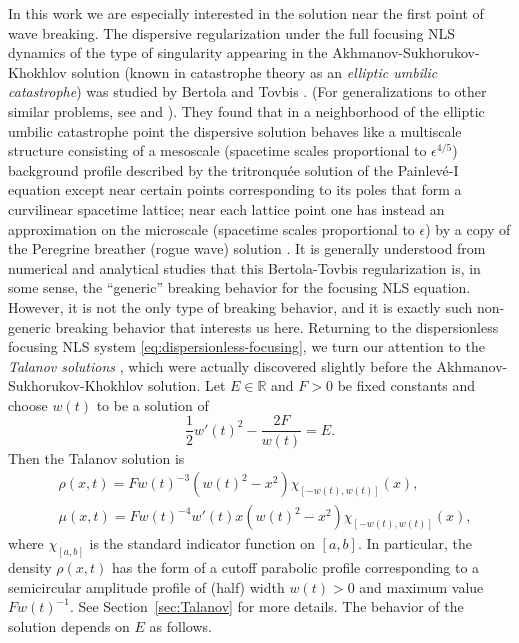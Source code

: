 \documentclass[12pt]{amsart}
\numberwithin{equation}{section}
\def\eq{\begin{equation}}
\def\endeq{\end{equation}}
\begin{document}
In this work we are especially interested in the solution near the first 
point of wave breaking.  The dispersive regularization under the full 
focusing NLS dynamics of the type of singularity appearing in the 
Akhmanov-Sukhorukov-Khokhlov solution (known in catastrophe theory as 
an \emph{elliptic umbilic catastrophe}) was studied by Bertola and Tovbis 
\cite{BertolaT13}. (For generalizations to other similar problems, see 
\cite{DubrovinGKM15} and \cite{LuM22}).  They found that in a neighborhood of 
the elliptic umbilic catastrophe point 
the dispersive solution behaves like a multiscale structure consisting of a 
mesoscale (spacetime scales proportional to $\epsilon^{4/5}$) background profile described by the tritronqu\'ee solution of the Painlev\'e-I equation except near certain points corresponding to its poles that form a 
curvilinear spacetime lattice; near each lattice point one has instead an 
approximation on the microscale (spacetime scales proportional to $\epsilon$) by a copy of the Peregrine breather (rogue 
wave) solution \cite{Peregrine83}.  It is generally understood from numerical 
and analytical studies that this Bertola-Tovbis regularization is, in some 
sense, the ``generic'' breaking behavior for the focusing NLS equation.  
However, it is not the only type of breaking behavior, and it is exactly such 
non-generic breaking behavior that interests us here.  Returning to the 
dispersionless focusing NLS system \eqref{eq:dispersionless-focusing}, we turn our attention to the 
\emph{Talanov solutions} \cite{Talanov65}, which were actually 
discovered slightly before the Akhmanov-Sukhorukov-Khokhlov solution.  Let 
$E\in\mathbb{R}$ and $F>0$ be fixed constants and choose $w(t)$ to be a 
solution of 
\eq
\frac{1}{2}w'(t)^2 -\frac{2F}{w(t)}=E.  
\endeq
Then the Talanov solution is 
\eq
\begin{split}
& \rho(x,t)=Fw(t)^{-3}(w(t)^2-x^2)\chi_{[-w(t),w(t)]}(x), \\
& \mu(x,t)=Fw(t)^{-4}w'(t)x(w(t)^2-x^2)\chi_{[-w(t),w(t)]}(x),
\end{split}
\label{eq:Talanov-solution}
\endeq
where $\chi_{[a,b]}$ is the standard indicator function on $[a,b]$.  In 
particular, the density $\rho(x,t)$ has the form of a 
cutoff parabolic profile corresponding to a semicircular amplitude profile of 
(half) width $w(t)>0$ and maximum value $Fw(t)^{-1}$.  See Section~\ref{sec:Talanov} 
for more details.  The behavior of the solution depends on $E$ as follows.
\end{document}
